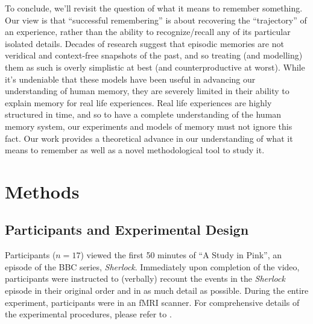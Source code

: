 \documentclass{article}
\begin{document}
To conclude, we'll revisit the question of what it means to remember something. Our view is that ``successful remembering'' is about recovering the ``trajectory'' of an experience, rather than the ability to recognize/recall any of its particular isolated details. Decades of research suggest that episodic memories are not veridical and context-free snapshots of the past, and so treating (and modelling) them as such is overly simplistic at best (and counterproductive at worst). While it's undeniable that these models have been useful in advancing our understanding of human memory, they are severely limited in their ability to explain memory for real life experiences. Real life experiences are highly structured in time, and so to have a complete understanding of the human memory system, our experiments and models of memory must not ignore this fact. Our work provides a theoretical advance in our understanding of what it means to remember as well as a novel methodological tool to study it.

\section*{Methods}
\label{sec:methods}

\subsection*{Participants and Experimental Design}
Participants ($n=17$) viewed the first 50 minutes of ``A Study in Pink'', an episode of the BBC series, \textit{Sherlock}. Immediately upon completion of the video, participants were instructed to (verbally) recount the events in the \textit{Sherlock} episode in their original order and in as much detail as possible. During the entire experiment, participants were in an fMRI scanner. For comprehensive details of the experimental procedures, please refer to \cite{ChenEtal17}.
\end{document}
